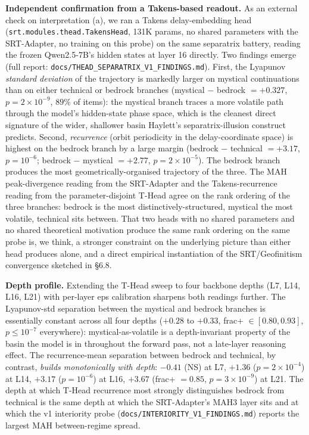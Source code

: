 \documentclass[
  11pt]{article}
\begin{document}
\textbf{Independent confirmation from a Takens-based readout.} As an
external check on interpretation (a), we ran a Takens delay-embedding
head (\texttt{srt.modules.thead.TakensHead}, 131K params, no shared
parameters with the SRT-Adapter, no training on this probe) on the same
separatrix battery, reading the frozen Qwen2.5-7B's hidden states at
layer 16 directly. Two findings emerge (full report:
\texttt{docs/THEAD\_SEPARATRIX\_V1\_FINDINGS.md}). First, the Lyapunov
\emph{standard deviation} of the trajectory is markedly larger on
mystical continuations than on either technical or bedrock branches
(mystical − bedrock \(= +0.327\), \(p = 2 \times 10^{-9}\), \(89\%\) of
items): the mystical branch traces a more volatile path through the
model's hidden-state phase space, which is the cleanest direct signature
of the wider, shallower basin Haylett's separatrix-illusion construct
predicts. Second, \emph{recurrence} (orbit periodicity in the
delay-coordinate space) is highest on the bedrock branch by a large
margin (bedrock − technical \(= +3.17\), \(p = 10^{-6}\); bedrock −
mystical \(= +2.77\), \(p = 2 \times 10^{-5}\)). The bedrock branch
produces the most geometrically-organised trajectory of the three. The
MAH peak-divergence reading from the SRT-Adapter and the
Takens-recurrence reading from the parameter-disjoint T-Head agree on
the rank ordering of the three branches: bedrock is the most
distinctively-structured, mystical the most volatile, technical sits
between. That two heads with no shared parameters and no shared
theoretical motivation produce the same rank ordering on the same probe
is, we think, a stronger constraint on the underlying picture than
either head produces alone, and a direct empirical instantiation of the
SRT/Geofinitism convergence sketched in §6.8.

\textbf{Depth profile.} Extending the T-Head sweep to four backbone
depths (L7, L14, L16, L21) with per-layer eps calibration sharpens both
readings further. The Lyapunov-std separation between the mystical and
bedrock branches is essentially constant across all four depths
(\(+0.28\) to \(+0.33\), frac+ \(\in [0.80, 0.93]\), \(p \le 10^{-7}\)
everywhere): mystical-as-volatile is a depth-invariant property of the
basin the model is in throughout the forward pass, not a late-layer
reasoning effect. The recurrence-mean separation between bedrock and
technical, by contrast, \emph{builds monotonically with depth}:
\(-0.41\) (NS) at L7, \(+1.36\) (\(p = 2 \times 10^{-4}\)) at L14,
\(+3.17\) (\(p = 10^{-6}\)) at L16, \(+3.67\) (frac+ \(= 0.85\),
\(p = 3 \times 10^{-9}\)) at L21. The depth at which T-Head recurrence
most strongly distinguishes bedrock from technical is the same depth at
which the SRT-Adapter's MAH3 layer sits and at which the v1 interiority
probe (\texttt{docs/INTERIORITY\_V1\_FINDINGS.md}) reports the largest
MAH between-regime spread.
\end{document}
